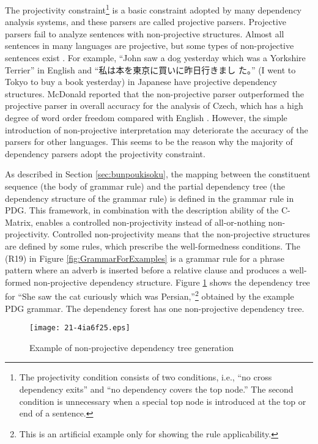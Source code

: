 \documentclass[english]{jnlp_1.4_rep}
\theoremstyle{break}
\theoremstyle{plain}
\theoremstyle{plain}
\begin{document}
The projectivity constraint\footnote{The projectivity condition
  consists of two conditions, i.e., ``no cross dependency exits'' and
  ``no dependency covers the top node.'' The second condition is
  unnecessary when a special top node is introduced at the top or end
  of a sentence.} is a basic constraint adopted by many dependency
analysis systems, and these parsers are called projective
parsers. Projective parsers fail to analyze sentences with
non-projective structures. Almost all sentences in many languages are
projective, but some types of non-projective sentences exist
\cite{Melcuk88}. For example, ``John saw a dog yesterday which was a
Yorkshire Terrier'' in English and ``私は本を東京に買いに昨日行きまし
た。'' (I went to Tokyo to buy a book yesterday) in Japanese have
projective dependency structures. McDonald reported that the
non-projective parser outperformed the projective parser in overall
accuracy for the analysis of Czech, which has a high degree of word
order freedom compared with English \cite{McDonald05}. However, the
simple introduction of non-projective interpretation may deteriorate
the accuracy of the parsers for other languages. This seems to be the
reason why the majority of dependency parsers adopt the projectivity
constraint.

As described in Section \ref{sec:bunpoukisoku}, the mapping between
the constituent sequence (the body of grammar rule) and the partial
dependency tree (the dependency structure of the grammar rule) is
defined in the grammar rule in PDG. This framework, in combination
with the description ability of the C-Matrix, enables a controlled
non-projectivity instead of all-or-nothing
non-projectivity. Controlled non-projectivity means that the
non-projective structures are defined by some rules, which prescribe
the well-formedness conditions. The (R19) in
Figure \ref{fig:GrammarForExamples} is a grammar rule for a phrase
pattern where an adverb is inserted before a relative clause and
produces a well-formed non-projective dependency
structure. Figure \ref{fig:Non-projectiveDT} shows the dependency tree
for ``She saw the cat curiously which was Persian,''\footnote{This is
  an artificial example only for showing the rule applicability.}
obtained by the example PDG grammar. The dependency forest has one
non-projective dependency tree.

\begin{figure}[b]
 \begin{center}
\texttt{[image: 21-4ia6f25.eps]}
 \end{center}
\caption{Example of non-projective dependency tree generation}
\label{fig:Non-projectiveDT}
\end{figure}
\end{document}
